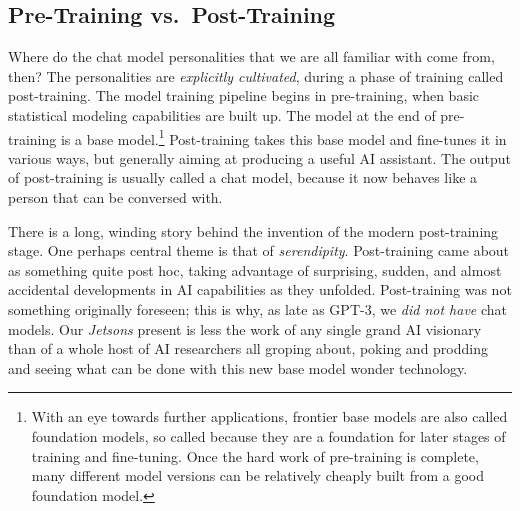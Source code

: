 \subsection{Pre-Training vs.\ Post-Training}
Where do the chat model personalities that we are all familiar with come from,
then? The personalities are \emph{explicitly cultivated}, during a phase of
training called post-training. The model training pipeline begins in
pre-training, when basic statistical modeling capabilities are built up. The
model at the end of pre-training is a base model.\footnote{With an eye towards
further applications, frontier base models are also called foundation models,
so called because they are a foundation for later stages of training and
fine-tuning. Once the hard work of pre-training is complete, many different
model versions can be relatively cheaply built from a good foundation model.}
Post-training takes this base model and fine-tunes it in various ways, but
generally aiming at producing a useful AI assistant. The output of
post-training is usually called a chat model, because it now behaves like a
person that can be conversed with.

There is a long, winding story behind the invention of the modern post-training
stage. One perhaps central theme is that of \emph{serendipity}. Post-training
came about as something quite post hoc, taking advantage of surprising, sudden,
and almost accidental developments in AI capabilities as they unfolded.
Post-training was not something originally foreseen; this is why, as late as
GPT-3, we \emph{did not have} chat models. Our \emph{Jetsons} present is less
the work of any single grand AI visionary than of a whole host of AI
researchers all groping about, poking and prodding and seeing what can be done
with this new base model wonder technology.

